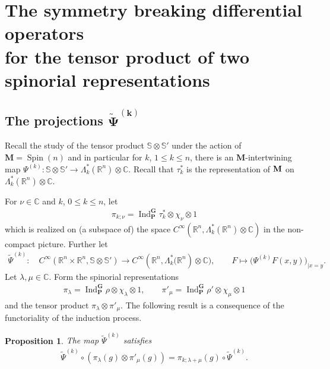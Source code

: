 \documentclass[10pt,a4paper]{amsart}
\DeclareMathOperator{\Spin}{Spin}
\DeclareMathOperator{\Ind}{Ind}
\numberwithin{equation}{section}
\newtheorem{prop}[theor]{Proposition}
\begin{document}
\section[The symmetry breaking differential operators for the tensor product of two spinorial representations]
{The symmetry breaking differential operators\\ for the tensor product of two spinorial representations}

\subsection[The projections tilde Psi(k)]{The projections $\boldsymbol{\widetilde \Psi^{(k)}}$}

Recall the study of the tensor product $\mathbb S\otimes \mathbb S'$ under the action of $\mathbf{M} = \Spin(n)$ and in particular
for $k$, $1\leq k\leq n$, there is an $\mathbf M$-intertwining map $\Psi^{(k)} \colon \mathbb S\otimes \mathbb{S}' \to \Lambda^*_k(\mathbb{R}^n)\otimes \mathbb C$. Recall that $\tau^*_k$ is the representation of $\bf M$ on $\Lambda^*_k(\mathbb{R}^n)\otimes\mathbb{C}$.

For $\nu\in \mathbb C$ and $k$, $0\leq k\leq n$, let
 \begin{gather*}
 \pi_{k;\nu} =\Ind_\mathbf P^\mathbf G{ \tau^*_k}\otimes \chi_\nu \otimes 1\end{gather*}
 which is realized on (a subspace of) the space $C^\infty(\mathbb R^n, \Lambda^*_k(\mathbb{R}^n)\otimes \mathbb C)$ in the non-compact picture. Further let
\begin{gather*}
\widetilde \Psi^{(k)} \colon\quad C^\infty(\mathbb R^n\times \mathbb R^n,
\mathbb S\otimes \mathbb{S}' )\to C^\infty( \mathbb R^n,
\Lambda^*_k\big(\mathbb R^n)\otimes\mathbb C\big),\qquad
F\mapsto \big(\Psi^{(k)}F(x,y)\big)_{\vert x=y}.
\end{gather*}
Let $\lambda, \mu \in \mathbb C$. Form the spinorial representations
\begin{gather*}
\pi_\lambda= \Ind_\mathbf P^\mathbf G \rho\otimes \chi_\lambda \otimes 1, \qquad \pi'_\mu= \Ind_\mathbf P^\mathbf G \rho'\otimes \chi_\mu\otimes 1
\end{gather*}
and the tensor product $\pi_\lambda \otimes \pi'_\mu$. The following result is a consequence of the functoriality of the induction process.

\begin{prop} The map $\widetilde \Psi^{(k)}$ satisfies
\begin{gather*}
\widetilde\Psi^{(k)}\circ (\pi_\lambda(g) \otimes \pi'_\mu(g)) = \pi_{k;\lambda+\mu}(g) \circ \widetilde\Psi^{(k)}.
\end{gather*}
\end{prop}
\end{document}
